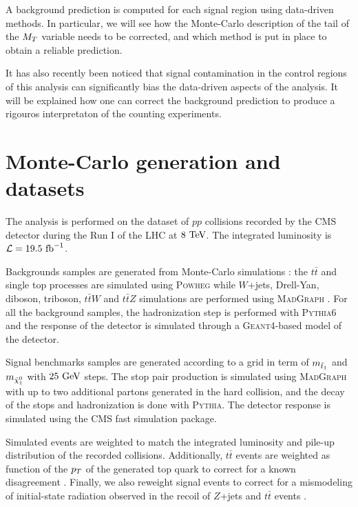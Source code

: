     A background prediction is computed for each signal region using data-driven methods.
    In particular, we will see how the Monte-Carlo description of the tail of the $M_T$ 
    variable needs to be corrected, and which method is put in place to obtain a reliable 
    prediction.

    It has also recently been noticed that signal contamination in the control regions of
    this analysis can significantly bias the data-driven aspects of the analysis. It will
    be explained how one can correct the background prediction to produce a rigouros
    interpretaton of the counting experiments.


    \section{Monte-Carlo generation and datasets}
    
    The analysis is performed on the dataset of $pp$ collisions recorded by the CMS detector
    during the Run I of the LHC at $8~\text{TeV}$. The integrated luminosity is $\mathcal{L} =
    19.5~\text{fb}^{-1}$.

    Backgrounds samples are generated from Monte-Carlo simulations : the $t\bar{t}$ and 
    single top processes are simulated using \textsc{Powheg} \cite{Powheg} while $W$+jets,
    Drell-Yan, diboson, triboson, $t\bar{t}W$ and $t\bar{t}Z$ simulations are performed 
    using \textsc{MadGraph} \cite{Madgraph}. For all the background samples, the 
    hadronization step is performed with \textsc{Pythia}6 \cite{Pythia} and the response of
    the detector is simulated through a \textsc{Geant4}-based model of the detector.
    
    Signal benchmarks samples are generated according to a grid in term of $m_{\tilde{t}_1}$
    and $m_{\tilde{\chi}_1^0}$ with $25~\text{GeV}$ steps. The stop pair production is simulated
    using \textsc{MadGraph} with up to two additional partons generated in the hard collision,
    and the decay of the stops and hadronization is done with \textsc{Pythia}. The detector
    response is simulated using the CMS fast simulation package. 

    Simulated events are weighted to match the integrated luminosity and pile-up distribution
    of the recorded collisions. Additionally, $t\bar{t}$ events are weighted as function of 
    the $p_T$ of the generated top quark to correct for a known disagreement . 
    Finally, we also reweight signal events to correct for a mismodeling of initial-state 
    radiation observed in the recoil of $Z$+jets and $t\bar{t}$ events \cite{ISRmodelingDominick}.

